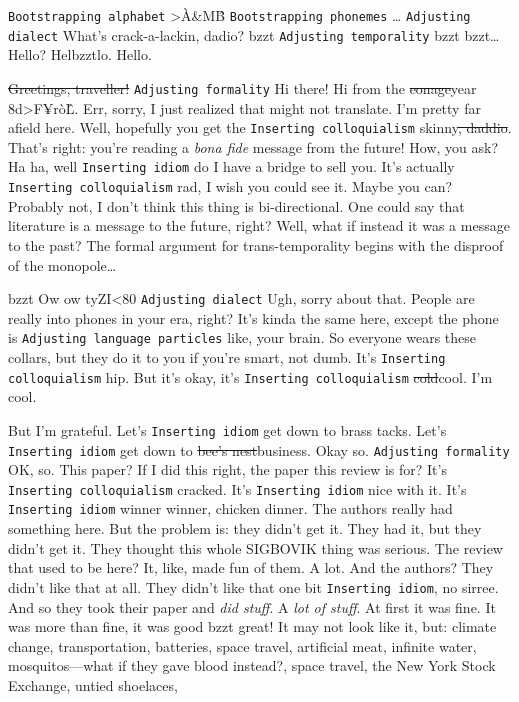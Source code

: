 \documentclass[12pt]{sigbovik-review}
\author{Dr. Cool B-)}
\begin{document}
\maketitle

\texttt{Bootstrapping alphabet}
>À\&<81>M\^B
\texttt{Bootstrapping phonemes}
…
\texttt{Adjusting dialect}
What's crack-a-lackin, dadio?
bzzt
\texttt{Adjusting temporality}
bzzt
bzzt…Hello?
Helbzztlo.
Hello.

\sout{Greetings, traveller!}
\texttt{Adjusting formality}
Hi there!
Hi from the \sout{eon}\sout{age}year 8d>F¥rò\^L.
Err, sorry, I just realized that might not translate.
I'm pretty far afield here.
Well, hopefully you get the \texttt{Inserting colloquialism} skinny\sout{, daddio}.
That's right: you're reading a \textit{bona fide} message from the future!
How, you ask?
Ha ha, well \texttt{Inserting idiom} do I have a bridge to sell you.
It's actually \texttt{Inserting colloquialism} rad, I wish you could see it.
Maybe you can?
Probably not, I don't think this thing is bi-directional.
One could say that literature is a message to the future, right?
Well, what if instead it was a message to the past?
The formal argument for trans-temporality begins with the disproof of the monopole…

bzzt Ow ow tyZI<80
\texttt{Adjusting dialect}
Ugh, sorry about that.
People are really into phones in your era, right?
It's kinda the same here, except the phone is \texttt{Adjusting language particles} like, your brain.
So everyone wears these collars, but they do it to you if you're smart, not dumb.
It's \texttt{Inserting colloquialism} hip.
But it's okay, it's \texttt{Inserting colloquialism} \sout{cold}cool.
I'm cool.

But I'm grateful.
Let's \texttt{Inserting idiom} get down to brass tacks.
Let's \texttt{Inserting idiom} get down to \sout{bee's nest}business.
Okay so.
\texttt{Adjusting formality}
OK, so.
This paper?
If I did this right, the paper this review is for?
It's \texttt{Inserting colloquialism} cracked.
It's \texttt{Inserting idiom} nice with it.
It's \texttt{Inserting idiom} winner winner, chicken dinner.
The authors really had something here.
But the problem is: they didn't get it.
They had it, but they didn't get it.
They thought this whole SIGBOVIK thing was serious.
The review that used to be here?
It, like, made fun of them.
A lot.
And the authors?
They didn't like that at all.
They didn't like that one bit \texttt{Inserting idiom}, no sirree.
And so they took their paper and \textit{did stuff}.
A \textit{lot of stuff}.
At first it was fine.
It was more than fine, it was good bzzt great!
It may not look like it, but: climate change, transportation, batteries, space
travel, artificial meat, infinite water, mosquitos—what if they gave blood
instead?, space travel, the New York Stock Exchange, untied shoelaces,
\end{document}
